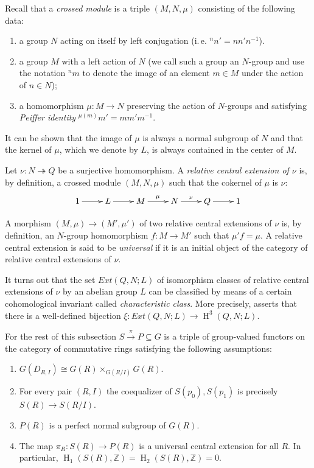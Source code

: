 \documentclass[oneside, 8pt]{amsart}
\theoremstyle{remark}
\theoremstyle{definition}
\numberwithin{lemma}{section}
\numberwithin{prop}{section}
\numberwithin{corollary}{section}
\numberwithin{externaltheorem}{section}
\DeclareMathOperator{\HH}{H}
\newcommand{\ZZ}{\mathbb{Z}}
\numberwithin{equation}{section}
\begin{document}
Recall that a {\it crossed module} is a triple $(M, N, \mu)$ consisting of the following data:
\begin{enumerate}
 \item a group $N$ acting on itself by left conjugation (i.\,e. ${}^{n}\!n' = n n' n^{-1}$).
 \item a group $M$ with a left action of $N$ (we call such a group an $N$-group and use the notation ${}^n m$ to denote the image of an element $m\in M$ under the action of $n \in N$);
 \item a homomorphism $\mu \colon M\to N$ preserving the action of $N$-groups and satisfying {\it Peiffer identity} ${}^{\mu(m)}\!m' = m m' m^{-1}$.
\end{enumerate}
It can be shown that the image of $\mu$ is always a normal subgroup of $N$ and that the kernel of $\mu$, which we denote by $L$, is always contained in the center of $M$.
 
Let $\nu \colon N \twoheadrightarrow Q$ be a surjective homomorphism.
A {\it relative central extension of $\nu$} is, by definition,
a crossed module $(M, N, \mu)$ such that the cokernel of $\mu$ is $\nu$:
\begin{equation} \label{RelativeCentralExtension}
 \xymatrix{ 1 \ar[r] & L \ar[r] & M \ar^{\mu}[r] & N \ar^{\nu}[r] & Q \ar[r] & 1} \end{equation}

A morphism $(M, \mu) \to (M', \mu')$ of two relative central extensions of $\nu$ is, by definition, an $N$-group homomorphism $f\colon M \to M'$ such that $\mu' f = \mu$. 
A relative central extension is said to be {\it universal} if it is an initial object of the category of relative central extensions of $\nu$. 

It turns out that the set $Ext(Q, N; L)$ of isomorphism classes of relative central extensions of $\nu$ by an abelian group $L$ can be classified by means of a certain cohomological invariant called {\it characteristic class}. More precisely, \cite[Th{\'e}or{\`e}me~1]{Lo78} asserts that there is a well-defined bijection $\xi \colon Ext(Q, N; L) \to \HH^3(Q, N; L)$.
 
For the rest of this subsection $S \xrightarrow{\pi} P \subseteq G$ is a triple of group-valued functors on the category of commutative rings satisfying the following assumptions:
\begin{enumerate} [label=(A\arabic*)]
 \item \label{req:left-exact} $G(D_{R, I}) \cong G(R) \times_{G(R/I)} G(R)$.
 \item \label{req:coeq} For every pair $(R, I)$ the coequalizer of $S(p_0), S(p_1)$ is precisely $S(R) \to S(R/I)$.
 \item \label{req:subfunc} $P(R)$ is a perfect normal subgroup of $G(R)$.
 \item \label{req:uce} The map $ \pi_R \colon S(R) \to P(R)$ is a universal central extension for all $R$. In particular, $\HH_1(S(R), \ZZ) = \HH_2(S(R), \ZZ) = 0$.
\end{enumerate}
\end{document}
